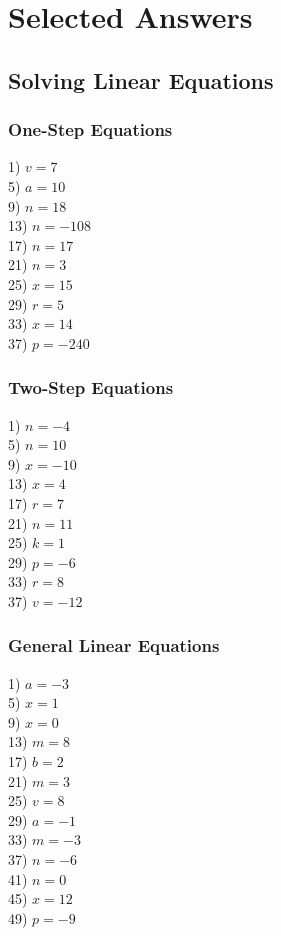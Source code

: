 \documentclass[12pt]{book}
\theoremstyle{definition}
\begin{document}
\section{Selected Answers}
\subsection*{Solving Linear Equations}
\subsubsection*{One-Step Equations}
\begin{multicols}{5}
1) $v=7$\\
5) $a=10$\\
9) $n=18$\\
13) $n=-108$\\
17) $n=17$\\
21) $n=3$\\
25) $x=15$\\
29) $r=5$\\
33) $x=14$\\
37) $p=-240$
\end{multicols}
\subsubsection*{Two-Step Equations}
\begin{multicols}{5}
1) $n=-4$\\
5) $n=10$\\
9) $x=-10$\\
13) $x=4$\\
17) $r=7$\\
21) $n=11$\\
25) $k=1$\\
29) $p=-6$\\
33) $r=8$\\
37) $v=-12$
\end{multicols}
\subsubsection*{General Linear Equations}
\begin{multicols}{5}
1) $a=-3$\\
5) $x=1$\\
9) $x=0$\\
13) $m=8$\\
17) $b=2$\\
21) $m=3$\\
25) $v=8$\\
29) $a=-1$\\
33) $m=-3$\\
37) $n=-6$\\
41) $n=0$\\
45) $x=12$\\
49) $p=-9$
\end{multicols}
\end{document}
